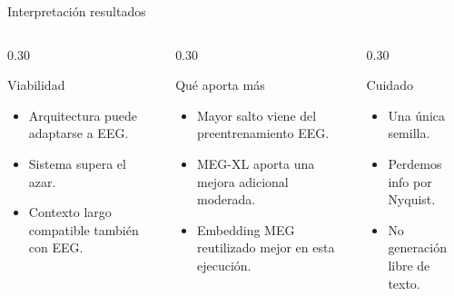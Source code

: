 \documentclass[aspectratio=169,10pt]{beamer}
\begin{document}
\begin{frame}[c]{Interpretación resultados}
  \small
  \begin{columns}[T,totalwidth=\linewidth]
    \begin{column}{0.30\linewidth}
      \begin{block}{Viabilidad}
        \begin{minipage}[t][30mm][t]{\linewidth}
        \begin{itemize}
          \item Arquitectura puede adaptarse a EEG.
          \item Sistema supera el azar.
          \item Contexto largo compatible también con EEG.
        \end{itemize}
        \end{minipage}
      \end{block}
    \end{column}
    \hfill

    \begin{column}{0.30\linewidth}
      \begin{block}{Qué aporta más}
        \begin{minipage}[t][30mm][t]{\linewidth}
        \begin{itemize}
          \item Mayor salto viene del preentrenamiento EEG.
          \item MEG-XL aporta una mejora adicional moderada.
          \item Embedding MEG reutilizado mejor en esta ejecución.
        \end{itemize}
        \end{minipage}
      \end{block}
    \end{column}
    \hfill

    \begin{column}{0.30\linewidth}
      \begin{alertblock}{Cuidado}
        \begin{minipage}[t][30mm][t]{\linewidth}
        \begin{itemize}
          \item Una única semilla.
          \item Perdemos info por Nyquist.
          \item No generación libre de texto.
        \end{itemize}
        \end{minipage}
      \end{alertblock}
    \end{column}
  \end{columns}


\end{frame}
\end{document}

